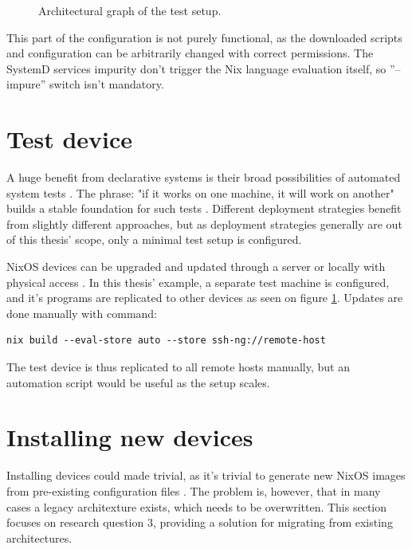 \begin{figure}

\caption{Architectural graph of the test setup.}
\label{parchitecture}
\end{figure}

This part of the configuration is not purely functional, as the
downloaded scripts and configuration can be arbitrarily changed with
correct permissions. The SystemD services impurity don't trigger the
Nix language evaluation itself, so ''--impure'' switch isn't
mandatory.

\section{Test device}

A huge benefit from declarative systems is their broad possibilities
of automated system tests \cite{van2010automating}. The phrase: "if it
works on one machine, it will work on another" builds a stable
foundation for such tests \cite{nixosNixOSManual}. Different
deployment strategies benefit from slightly different approaches, but
as deployment strategies generally are out of this thesis' scope, only
a minimal test setup is configured.

NixOS devices can be upgraded and updated through a server or locally
with physical access \cite{nixosNixOSManual}. In this thesis' example,
a separate test machine is configured, and it's programs are
replicated to other devices as seen on figure
\ref{parchitecture}. Updates are done manually with command:

\begin{lstlisting}
nix build --eval-store auto --store ssh-ng://remote-host
\end{lstlisting}

The test device is thus replicated to all remote hosts manually, but
an automation script would be useful as the setup scales.

\section{Installing new devices} \label{instnewdevices}

Installing devices could made trivial, as it's trivial to generate new
NixOS images from pre-existing configuration files
\cite{nixosNixOSManual}. The problem is, however, that in many cases a
legacy architexture exists, which needs to be overwritten. This
section focuses on research question 3, providing a solution for
migrating from existing architectures.

